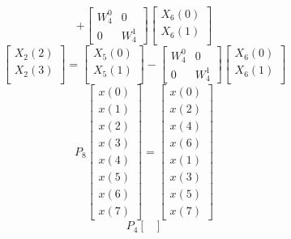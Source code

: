 \documentclass[journal,12pt,twocolumn]{IEEEtran}
\renewcommand\thesection{\arabic{section}}
\begin{document}
\begin{enumerate}[label=\arabic*.,ref=\thesection.\theenumi]
\begin{equation}
	+
	\begin{bmatrix}
		W^{0}_{4} & 0\\
		0 & W^{1}_{4}
	\end{bmatrix}
	\begin{bmatrix}
		X_{6}(0) \\ 
		X_{6}(1) \\ 
	\end{bmatrix}
\end{equation}
\begin{equation}
	\begin{bmatrix}
		X_{2}(2) \\ 
		X_{2}(3)\\ 
	\end{bmatrix}
	=
	\begin{bmatrix}
		X_{5}(0) \\ 
		X_{5}(1)\\ 
	\end{bmatrix}
	-
	\begin{bmatrix}
		W^{0}_{4} & 0\\
		0 & W^{1}_{4}
	\end{bmatrix}
	\begin{bmatrix}
		X_{6}(0) \\ 
		X_{6}(1) \\ 
	\end{bmatrix}
\end{equation}
\begin{equation}
	P_{8}
	\begin{bmatrix}
		x(0) \\ 
		x(1) \\ 
		x(2) \\ 
		x(3) \\ 
		x(4) \\ 
		x(5) \\
		x(6) \\
		x(7)
	\end{bmatrix}
	= 
	\begin{bmatrix}
		x(0) \\ 
		x(2) \\ 
		x(4) \\ 
		x(6) \\
		x(1) \\ 
		x(3) \\ 
		x(5) \\
		x(7)
	\end{bmatrix}
\end{equation}
\begin{equation}
	P_{4}
	\begin{bmatrix}

\end{bmatrix}
\end{equation}
\end{enumerate}
\end{document}
